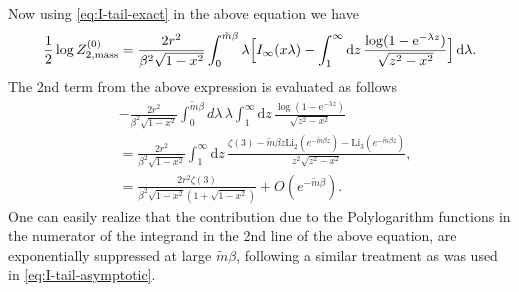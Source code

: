 \documentclass[a4paper,11pt]{article}
\newcommand{\e}{\mathrm e}
\newcommand{\dd}{\mathrm d}
\begin{document}
Now using \eqref{eq:I-tail-exact} in the above equation we have 
\begin{align}
	\frac{1}{2}\log Z_{2,{\rm mass}}^{(0)}=\frac{2r^2}{\beta^2\sqrt{1-x^2}}
	\int_0^{\tilde m\beta}\lambda \Big[I_\infty(x\lambda)-\int_1^\infty\dd z\,
	\frac{\log(1-\e^{-\lambda z})}{\sqrt{z^2-x^2}}\Big]\,\dd\lambda.
	\label{eq:Zth-lambda1}
\end{align}
The 2nd term from the above expression is evaluated as follows
\begin{align}\label{2nd term}
&	-\frac{2r^2}{\beta^2\sqrt{1-x^2}}
	\int_0^{\tilde m\beta}d\lambda\,\lambda \int_1^\infty\dd z\,
	\frac{\log(1-\e^{-\lambda z})}{\sqrt{z^2-x^2}}\nonumber\\
	&=\frac{2r^2}{\beta^2\sqrt{1-x^2}}
	\int_1^\infty\dd z\,
	\frac{\zeta (3)-\tilde m\beta z \text{Li}_2\left(e^{-\tilde m\beta z}\right)-\text{Li}_3\left(e^{-\tilde m\beta z}\right)}{z^2 \sqrt{z^2-x^2}}\nonumber,\\
	&=\frac{2r^2 \zeta (3)}{\beta^2\sqrt{1-x^2} (1+\sqrt{1-x^2})}+O(e^{-\tilde{m}\beta}).
\end{align}
One can easily realize that the contribution due to the Polylogarithm functions in the numerator of the integrand in the 2nd line of the above equation, are exponentially suppressed at large $\tilde m\beta$, following a similar treatment as was used in \eqref{eq:I-tail-asymptotic}.
%
%
\\
\end{document}
